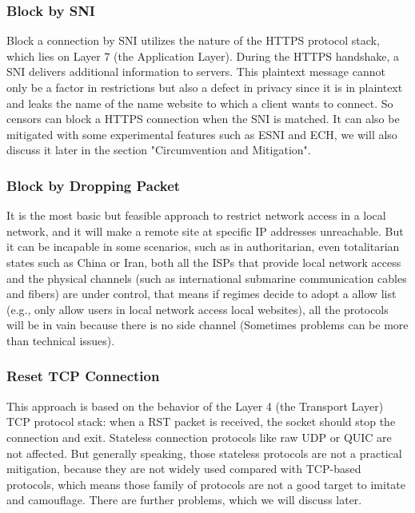 \documentclass[conference]{IEEEtran}
\begin{document}
\subsubsection{Block by SNI}
Block a connection by SNI utilizes the nature of the HTTPS protocol stack, which lies on Layer 7 (the Application Layer). During the HTTPS handshake, a SNI delivers additional information to servers. This plaintext message cannot only be a factor in restrictions but also a defect in privacy since it is in plaintext and leaks the name of the name website to which a client wants to connect. So censors can block a HTTPS connection when the SNI is matched.
It can also be mitigated with some experimental features such as ESNI and ECH, we will also discuss it later in the section "Circumvention and Mitigation".

\subsubsection{Block by Dropping Packet}
It is the most basic but feasible approach to restrict network access in a local network, and it will make a remote site at specific IP addresses unreachable.
But it can be incapable in some scenarios, such as in authoritarian, even totalitarian states such as China or Iran, both all the ISPs that provide local network access and the physical channels (such as international submarine communication cables and fibers) are under control, that means if regimes decide to adopt a allow list (e.g., only allow users in local network access local websites), all the protocols will be in vain because there is no side channel (Sometimes problems can be more than technical issues).

\subsubsection{Reset TCP Connection}
This approach is based on the behavior of the Layer 4 (the Transport Layer) TCP protocol stack: when a RST packet is received, the socket should stop the connection and exit. Stateless connection protocols like raw UDP or QUIC are not affected. But generally speaking, those stateless protocols are not a practical mitigation, because they are not widely used compared with TCP-based protocols, which means those family of protocols are not a good target to imitate and camouflage. There are further problems, which we will discuss later.
\end{document}
